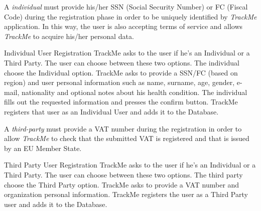 \documentclass[a4paper]{article}
\begin{document}
        A  \textit{individual} must provide his/her SSN (Social Security Number) or FC (Fiscal Code) during the registration phase in order to be uniquely identified by \textit{TrackMe} application. In this way, the user is also accepting terms of service and allows \textit{TrackMe} to acquire his/her personal data.
        \begin{usecase}{Individual User Registration}
              {TrackMe asks to the user if he's an Individual or a Third Party. The user can choose between these two options.}
              {The individual choose the Individual option.}
              {TrackMe asks to provide a SSN/FC (based on region) and user personal information such as name, surname, age, gender, e-mail, nationality and optional notes about his health condition.}
              {The individual fills out the requested information and presses the confirm button.}
              {TrackMe registers that user as an Individual User and adds it to the  Database.}
        \end{usecase}
        
        A \textit{third-party} must provide a VAT number during the registration in order to allow \textit{TrackMe} to check that the submitted VAT is registered and that is issued by an EU Member State.
        
        \begin{usecase}{Third Party User Registration}
              {TrackMe asks to the user if he's an Individual or a Third Party. The user can choose between these two options.}
              {The third party choose the Third Party option.}
              {TrackMe asks to provide a VAT number and organization personal information.}
              {TrackMe registers the user as a Third Party user and adds it to the Database.}
        \end{usecase}
        
\end{document}

